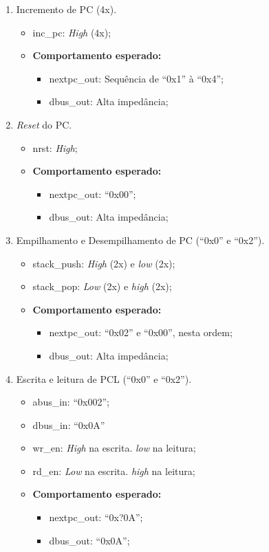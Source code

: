 \documentclass{article}
\begin{document}
\begin{enumerate}
    \item Incremento de PC (4x).
    \begin{itemize}
        \item inc\_pc: \textit{High} (4x);
        \item \textbf{Comportamento esperado:}
        \begin{itemize}
            \item nextpc\_out: Sequência de ``0x1'' à ``0x4'';
            \item dbus\_out: Alta impedância;
        \end{itemize}
    \end{itemize}

    \item \textit{Reset} do PC.
    \begin{itemize}
        \item nrst: \textit{High};
        \item \textbf{Comportamento esperado:}
        \begin{itemize}
            \item nextpc\_out: ``0x00'';
            \item dbus\_out: Alta impedância;
        \end{itemize}
    \end{itemize}

    \item Empilhamento e Desempilhamento de PC (``0x0'' e ``0x2'').
    \begin{itemize}
        \item stack\_push: \textit{High} (2x) e \textit{low} (2x);
        \item stack\_pop: \textit{Low} (2x) e \textit{high} (2x);
        \item \textbf{Comportamento esperado:}
        \begin{itemize}
            \item nextpc\_out: ``0x02'' e ``0x00'', nesta ordem;
            \item dbus\_out: Alta impedância;
        \end{itemize}
    \end{itemize}

    \item Escrita e leitura de PCL (``0x0'' e ``0x2'').
    \begin{itemize}
        \item abus\_in: ``0x002'';
        \item dbus\_in: ``0x0A''
        \item wr\_en: \textit{High} na escrita. \textit{low} na leitura;
        \item rd\_en: \textit{Low} na escrita. \textit{high} na leitura;
        \item \textbf{Comportamento esperado:}
        \begin{itemize}
            \item nextpc\_out: ``0x?0A'';
            \item dbus\_out: ``0x0A'';
        \end{itemize}
    \end{itemize}
    

\end{enumerate}
\end{document}
